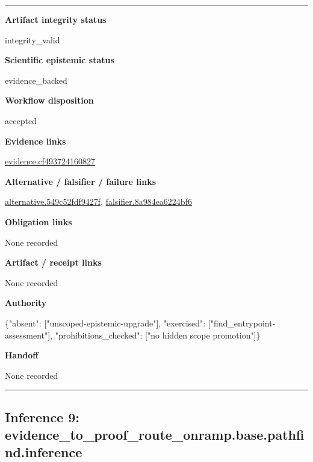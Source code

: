 \documentclass[10pt,a4paper]{article}
\newcommand{\TraceField}[2]{\par\noindent\textbf{#1}\par\noindent #2\par\smallskip}
\newenvironment{TraceDossier}{\par\medskip\noindent\hrule\medskip}{\medskip\hrule\par\medskip}
\begin{document}
\begin{TraceDossier}
\TraceField{Artifact integrity status}{integrity\_\allowbreak{}valid}

\TraceField{Scientific epistemic status}{evidence\_\allowbreak{}backed}

\TraceField{Workflow disposition}{accepted}

\TraceField{Evidence links}{\hyperlink{trace-evidence-409a4f19e3c32c38ff}{evidence.\allowbreak{}cf49372416\allowbreak{}0827}}

\TraceField{Alternative / falsifier / failure links}{\hyperlink{trace-alternative-79e1ee1491569bfe2b}{alternativ\allowbreak{}e.\allowbreak{}549c52fdf9\allowbreak{}427f}, \hyperlink{trace-alternative-510f25e498e7c818fb}{falsifier.\allowbreak{}8a984ea622\allowbreak{}4bf6}}

\TraceField{Obligation links}{None recorded}

\TraceField{Artifact / receipt links}{None recorded}

\TraceField{Authority}{\{"absent":\allowbreak{} ["unscoped\allowbreak{}-\allowbreak{}epistemic-\allowbreak{}upgrade"],\allowbreak{} "exercised\allowbreak{}":\allowbreak{} ["find\_\allowbreak{}entrypoint\allowbreak{}-\allowbreak{}assessment\allowbreak{}"], "prohibiti\allowbreak{}ons\_\allowbreak{}checked":\allowbreak{} ["no hidden scope promotion"\allowbreak{}]\}}

\TraceField{Handoff}{None recorded}

\end{TraceDossier}
\pagebreak[2]\subsection{Inference 9: evidence\_\allowbreak{}to\_\allowbreak{}proof\_\allowbreak{}route\_\allowbreak{}onramp.\allowbreak{}base.\allowbreak{}pathfind.\allowbreak{}inference}\label{trace-inference-9068100080f4310082}
\end{document}
